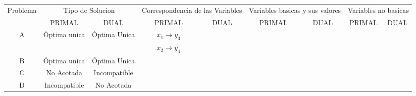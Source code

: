     \begin{tabular}{c|cc|cc|cc|cc}
    \hline
    \hline
    Problema & \multicolumn{2}{c|}{Tipo de Solucion } & \multicolumn{2}{c|}{Correspondencia de las Variables} & \multicolumn{2}{c|}{Variables basicas  y sus valores} & \multicolumn{2}{c}{Variables no basicas} \bigstrut[t]\\
            & PRIMAL  & DUAL    & PRIMAL  & DUAL    & PRIMAL  & DUAL    & PRIMAL  & DUAL \bigstrut[b]\\
    \hline
    \hline
    \multirow{2}[2]{*}{A} & \multirow{2}[2]{*}{Óptima unica} & \multirow{2}[2]{*}{Óptima Unica} & $x_1 \rightarrow y_3$ &         &         &         &         &  \bigstrut[t]\\
            &         &         &   $x_2 \rightarrow y_4$ &         &         &         &         &  \bigstrut[b]\\
    \hline
    \multirow{3}[2]{*}{B} & \multirow{3}[2]{*}{Óptima unica} & \multirow{3}[2]{*}{Óptima Unica} &         &         &         &         &         &  \bigstrut[t]\\
            &         &         &         &         &         &         &         &  \\
            &         &         &         &         &         &         &         &  \bigstrut[b]\\
    \hline
    \multirow{2}[2]{*}{C} & \multirow{2}[2]{*}{No Acotada} & \multirow{2}[2]{*}{Incompatible} &         &         &         &         &         &  \bigstrut[t]\\
            &         &         &         &         &         &         &         &  \bigstrut[b]\\
    \hline
    \multirow{2}[2]{*}{D} & \multirow{2}[2]{*}{Incompatible} & \multirow{2}[2]{*}{No Acotada} &         &         &         &         &         &  \bigstrut[t]\\
            &         &         &         &         &         &         &         &  \bigstrut[b]\\
    \hline
    \hline
    \end{tabular}%
